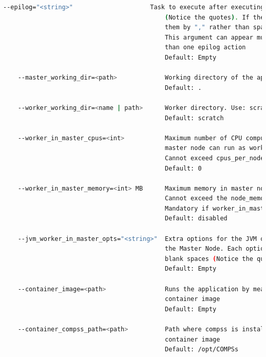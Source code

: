 \begin{lstlisting}[language=bash]
    --epilog="<string>"                     Task to execute after executing the COMPSs application
                                            (Notice the quotes). If the task has arguments split
                                            them by "," rather than spaces.
                                            This argument can appear multiple times for more 
                                            than one epilog action
                                            Default: Empty

    --master_working_dir=<path>             Working directory of the application
                                            Default: .
                                            
    --worker_working_dir=<name | path>      Worker directory. Use: scratch | gpfs | <path>
                                            Default: scratch
                                              
    --worker_in_master_cpus=<int>           Maximum number of CPU computing units that the 
                                            master node can run as worker. 
                                            Cannot exceed cpus_per_node.
                                            Default: 0
                                            
    --worker_in_master_memory=<int> MB      Maximum memory in master node assigned to the worker. 
                                            Cannot exceed the node_memory.
                                            Mandatory if worker_in_master_tasks is specified.
                                            Default: disabled
                                            
    --jvm_worker_in_master_opts="<string>"  Extra options for the JVM of the COMPSs Worker in 
                                            the Master Node. Each option separed by "," and without
                                            blank spaces (Notice the quotes)
                                            Default: Empty
                                            
    --container_image=<path>                Runs the application by means of a singularity 
                                            container image
                                            Default: Empty
                                            
    --container_compss_path=<path>          Path where compss is installed in the Singularity 
                                            container image
                                            Default: /opt/COMPSs


\end{lstlisting}
